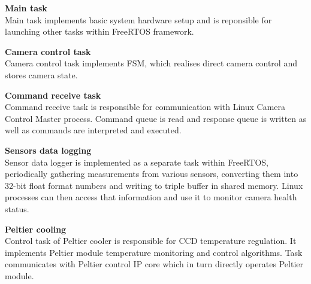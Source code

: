 \begin{description}

\item \textbf{Main task} \hfill \\
Main task implements basic system hardware setup and is reponsible for launching other tasks within FreeRTOS framework.

\item \textbf{Camera control task} \hfill \\
Camera control task implements FSM, which realises direct camera control and stores camera state.

\item \textbf{Command receive task} \hfill \\
Command receive task is responsible for communication with Linux Camera Control Master process. Command queue is read and response queue is written as well as commands are interpreted and executed.

\item \textbf{Sensors data logging} \hfill \\
Sensor data logger is implemented as a separate task within FreeRTOS, periodically gathering measurements from various sensors, converting them into 32-bit float format numbers and writing to triple buffer in shared memory. Linux processes can then access that information and use it to monitor camera health status.

\item \textbf{Peltier cooling} \hfill \\
Control task of Peltier cooler is responsible for CCD temperature regulation. It implements Peltier module temperature monitoring and control algorithms. Task communicates with Peltier control IP core which in turn directly operates Peltier module.

\end{description}

%
%

